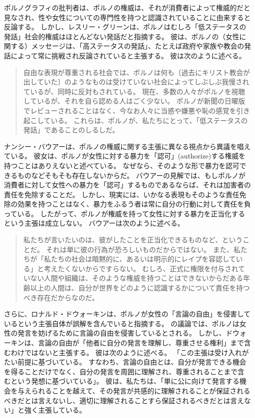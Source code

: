 \documentclass[paper=a4,book,openany]{jlreq} \usepackage{mystyle}
\begin{document}
ポルノグラフィの批判者は、ポルノの権威は、それが消費者によって権威的だと見なされ、性や女性についての専門性を持つと認識されていることに由来すると反論する\citep[p.430]{langton12:_respon}。
しかし、レスリー・グリーンは、ポルノはむしろ「低ステータスの発話」{\DDASH}社会的権威はほとんどない発話{\DDASH}だと指摘する。
彼は、ポルノの（女性に関する）メッセージは、「高ステータスの発話」、たとえば政府や家族や教会の発話によって常に挑戦され反論されていると主張する。
彼は次のように述べる。

\begin{quote}
自由な表現が尊重される社会では、ポルノは何も〔過去にキリスト教会が出していた〕のようなものは受けていない{\DDASH}社会によってしぶしぶ我慢されているが、同時に反対もされている。
現在、多数の人々がポルノを視聴しているが、それを自ら認める人はごく少ない。
ポルノが新聞の日曜版でレビューされることはなく、今なお人々に当惑や嫌悪や恥の感覚を引き起こしている。
これらは、ポルノが、私たちにとって、「低ステータスの発話」であることのしるしだ。
\citep[pp.296--297]{green98:_pornog_subor_silen}
\end{quote}

ナンシー・バウアーは、ポルノの権威に関する主張に異なる視点から異議を唱えている。
彼女は、ポルノが女性に対する暴力を「認可」(authorize)する権威を持つことはありえないと述べている。
なぜなら、そのような形で暴力を認可できるものなどそもそも存在しないからだ。
バウアーの見解では、もしポルノが消費者に対して女性への暴力を「認可」するものであるならば、それは加害者の責任を免除することだ。
しかし、現実には、いかなる表現もそのような責任免除の効果を持つことはなく、暴力をふるう者は常に自分の行動に対して責任を負っている。
したがって、ポルノが権威を持って女性に対する暴力を正当化するという主張は成立しない。
バウアーは次のように述べる。

\begin{quote}
私たちが言いたいのは、彼がしたことを正当化できるものなど、ということだ。
それは単に彼の行為が恐ろしいものだからではない。
また、私たちが「私たちの社会は暗黙的に、あるいは明示的にレイプを容認している」と考えたくないからですらない。
むしろ、正式に権限を付与されていない人間や組織は、そのような権威を持つことはできないからだ{\DDASH}ある年齢以上の人間は、自分が世界をどのように認識するかについて責任を持つべき存在だからなのだ。
\citep[pp.86--87]{bauer06:_how_do_thing_pornog}
\end{quote}

さらに、ロナルド・ドウォーキンは、ポルノが女性の「言論の自由」を侵害しているという主張自体が誤解を含んでいると指摘する。
の議論では、ポルノは女性の発言を妨げるために言論の自由を侵害しているとされる。
しかし、ドウォーキンは、言論の自由が「他者に自分の発言を理解し、尊重させる権利」まで含むわけではないと主張する。
彼は次のように述べる。
「この主張は受け入れがたい前提に基づいている。
すなわち、言論の自由とは、自分が発言できる機会を得ることだけでなく、自分の発言を周囲に理解され、尊重されることまで含むという発想に基づいている」。
彼は、私たちは、「単に公に向けて発言する機会を与えられることを越えて、その発言が共感的に理解されることが保証されるべきだとは言えないし、適切に理解されることすら保証されるべきだとは言えない」と強く主張している\citep[p.232]{dworkin96:_freed_law}。
\end{document}
